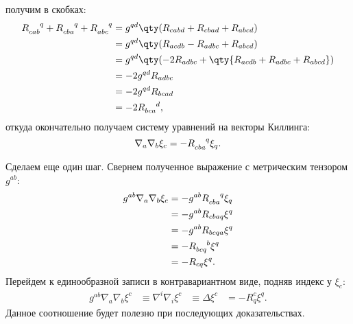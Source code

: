     получим в скобках:
    \begin{equation}\begin{aligned}
        R_{cab}^{\hphantom{cab}q} +
        R_{cba}^{\hphantom{cba}q} +
        R_{abc}^{\hphantom{abc}q}
            &= g^{qd} \qty(
                R_{cabd} + R_{cbad} + R_{abcd}
            ) \\
            &= g^{qd} \qty(
                R_{acdb} - R_{adbc} + R_{abcd}
            ) \\
            &= g^{qd} \qty(
                - 2 R_{adbc} + \qty{ R_{acdb} + R_{adbc} + R_{abcd} }
            ) \\
            &= - 2 g^{qd} R_{adbc} \\
            &= - 2 g^{qd} R_{bcad} \\
            &= - 2 R_{bca}^{\hphantom{bca}d} ,
    \end{aligned}\end{equation}
    откуда окончательно получаем систему уравнений на векторы Киллинга:
    \begin{equation}\label{eq:killing_eq}
        \nabla_a \nabla_b \xi_c = - R_{cba}^{\hphantom{cba}q} \xi_q .
    \end{equation}

    Сделаем еще один шаг. Свернем полученное выражение с метрическим тензором $g^{ab}$:
    \begin{equation}\begin{aligned}
        g^{ab} \nabla_a \nabla_b \xi_c
            &= - g^{ab} R_{cba}^{\hphantom{cba}q} \xi_q \\
            &= - g^{ab} R_{cbaq} \xi^q \\
            &= - g^{ab} R_{bcqa} \xi^q \\
            &= - R_{bcq}^{\hphantom{bcq}b} \xi^q \\
            &= - R_{cq} \xi^q .
    \end{aligned}\end{equation}
    Перейдем к единообразной записи в контравариантном виде, подняв индекс у $\xi_c$:
    \begin{equation}\begin{aligned}\label{eq:killing_eq_lap}
        g^{ab} \nabla_a \nabla_b \xi^c
            &\equiv \nabla^i \nabla_i \xi^c
            &\equiv \Delta \xi^c
            &= - R^c_q \xi^q .
    \end{aligned}\end{equation}
    Данное соотношение будет полезно при последующих доказательствах.

